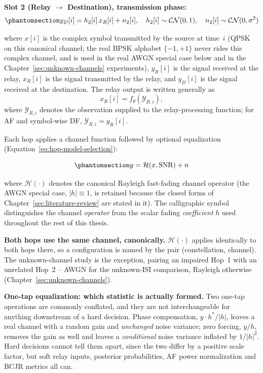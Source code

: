 \textbf{Slot 2 (Relay $\to$ Destination), transmission phase:} \begin{equation}\protect\phantomsection\label{eq:rayleigh-hop2}{y_D[i] = h_2[i]\,x_R[i] + n_2[i], \quad h_2[i] \sim \mathcal{CN}(0, 1), \quad n_2[i] \sim \mathcal{CN}(0, \sigma^2)
}\end{equation}

where \(x[i]\) is the complex symbol transmitted by the source at time~$i$ (QPSK on this canonical channel; the real BPSK alphabet $\{-1,+1\}$ never rides this complex channel, and is used in the real AWGN special case below and in the Chapter~\ref{sec:unknown-channels} experiments), \(y_R[i]\) is the signal received at the relay, \(x_R[i]\) is the signal transmitted by the relay, and \(y_D[i]\) is the signal received at the destination. The relay output is written generally as \[ x_R[i] = f_\theta\!\left(\mathcal{Y}_{R,i}\right), \] where \(\mathcal{Y}_{R,i}\) denotes the observation supplied to the relay-processing function; for AF and symbol-wise DF, \(\mathcal{Y}_{R,i}=y_R[i]\).

Each hop applies a channel function followed by optional equalization (Equation~\ref{eq:hop-model-selection}):

\begin{equation}\protect\phantomsection\label{eq:hop-model-selection}{y = \mathcal{H}(x, \text{SNR}) + n}
\end{equation}

where \(\mathcal{H}(\cdot)\) denotes the canonical Rayleigh fast-fading channel operator (the AWGN special case, $|h|\equiv1$, is retained because the closed forms of Chapter~\ref{sec:literature-review} are stated in it). The calligraphic symbol distinguishes the channel \emph{operator} from the scalar fading \emph{coefficient} \(h\) used throughout the rest of this thesis.

\textbf{Both hops use the same channel, canonically.} \(\mathcal{H}(\cdot)\) applies identically to both hops there, so a configuration is named by the pair (constellation, channel). The unknown-channel study is the exception, pairing an impaired Hop~1 with an unrelated Hop~2 -- AWGN for the unknown-ISI comparison, Rayleigh otherwise (Chapter~\ref{sec:unknown-channels}).

\textbf{One-tap equalization: which statistic is actually formed.} Two one-tap operations are commonly conflated, and they are not interchangeable for anything downstream of a hard decision. Phase compensation, $y \cdot h^{*}/|h|$, leaves a real channel with a random gain and \emph{unchanged} noise variance; zero forcing, $y/h$, removes the gain as well and leaves a \emph{conditional} noise variance inflated by $1/|h|^{2}$. Hard decisions cannot tell them apart, since the two differ by a positive scale factor, but soft relay inputs, posterior probabilities, AF power normalization and BCJR metrics all can.

